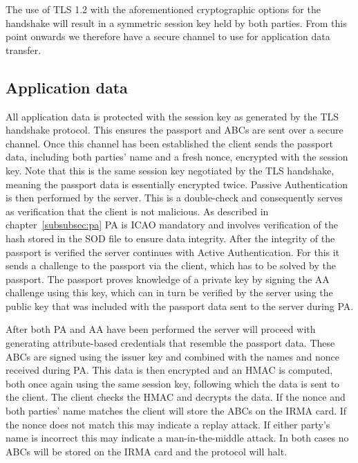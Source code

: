 The use of TLS 1.2 with the aforementioned cryptographic options for the handshake will result in a symmetric session key held by both parties. From this point onwards we therefore have a secure channel to use for application data transfer.

\subsection{Application data}
All application data is protected with the session key as generated by the TLS handshake protocol. This ensures the passport and ABCs are sent over a secure channel. Once this channel has been established the client sends the passport data, including both parties' name and a fresh nonce, encrypted with the session key. Note that this is the same session key negotiated by the TLS handshake, meaning the passport data is essentially encrypted twice. Passive Authentication is then performed by the server. This is a double-check and consequently serves as verification that the client is not malicious. As described in chapter~\ref{subsubsec:pa} PA is ICAO mandatory and involves verification of the hash stored in the SOD file to ensure data integrity. After the integrity of the passport is verified the server continues with Active Authentication. For this it sends a challenge to the passport via the client, which has to be solved by the passport. The passport proves knowledge of a private key by signing the AA challenge using this key, which can in turn be verified by the server using the public key that was included with the passport data sent to the server during PA.

After both PA and AA have been performed the server will proceed with generating attribute-based credentials that resemble the passport data. These ABCs are signed using the issuer key and combined with the names and nonce received during PA. This data is then encrypted and an HMAC is computed, both once again using the same session key, following which the data is sent to the client. The client checks the HMAC and decrypts the data. If the nonce and both parties' name matches the client will store the ABCs on the IRMA card. If the nonce does not match this may indicate a replay attack. If either party's name is incorrect this may indicate a man-in-the-middle attack. In both cases no ABCs will be stored on the IRMA card and the protocol will halt.

